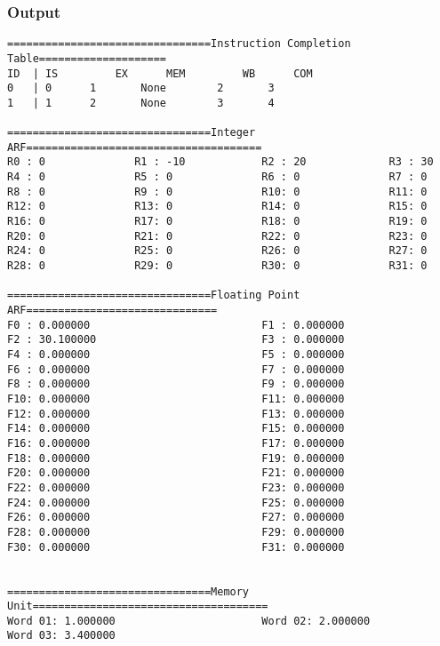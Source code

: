 \documentclass[12pt]{article}
\begin{document}
\subsubsection*{Output}
\begin{verbatim}
================================Instruction Completion Table====================
ID	| IS		 EX		 MEM		 WB		 COM
0	| 0		 1		 None		 2		 3
1	| 1		 2		 None		 3		 4

================================Integer ARF=====================================
R0 : 0              R1 : -10            R2 : 20             R3 : 30             
R4 : 0              R5 : 0              R6 : 0              R7 : 0              
R8 : 0              R9 : 0              R10: 0              R11: 0              
R12: 0              R13: 0              R14: 0              R15: 0              
R16: 0              R17: 0              R18: 0              R19: 0              
R20: 0              R21: 0              R22: 0              R23: 0              
R24: 0              R25: 0              R26: 0              R27: 0              
R28: 0              R29: 0              R30: 0              R31: 0              

================================Floating Point ARF==============================
F0 : 0.000000                           F1 : 0.000000                           
F2 : 30.100000                          F3 : 0.000000                           
F4 : 0.000000                           F5 : 0.000000                           
F6 : 0.000000                           F7 : 0.000000                           
F8 : 0.000000                           F9 : 0.000000                           
F10: 0.000000                           F11: 0.000000                           
F12: 0.000000                           F13: 0.000000                           
F14: 0.000000                           F15: 0.000000                           
F16: 0.000000                           F17: 0.000000                           
F18: 0.000000                           F19: 0.000000                           
F20: 0.000000                           F21: 0.000000                           
F22: 0.000000                           F23: 0.000000                           
F24: 0.000000                           F25: 0.000000                           
F26: 0.000000                           F27: 0.000000                           
F28: 0.000000                           F29: 0.000000                           
F30: 0.000000                           F31: 0.000000                           


================================Memory Unit=====================================
Word 01: 1.000000                       Word 02: 2.000000                       
Word 03: 3.400000
\end{verbatim}
\end{document}
